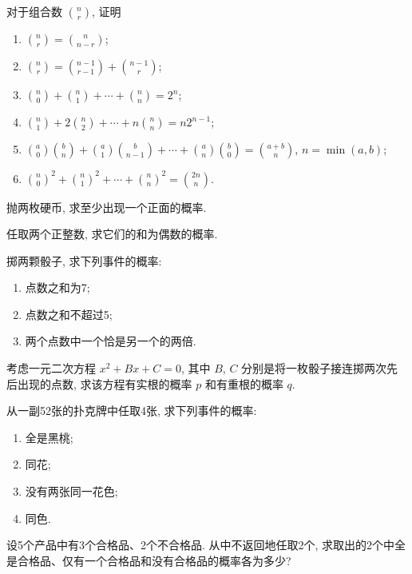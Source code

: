 \begin{xiti}
  \item 对于组合数 $\binom{n}{r}$, 证明
  \begin{enumerate}
    \item $\binom{n}{r} = \binom{n}{n - r}$;
    \item $\binom{n}{r} = \binom{n - 1}{r - 1} + \binom{n - 1}{r}$;
    \item $\binom{n}{0} + \binom{n}{1} + \dotsb + \binom{n}{n} = 2^n$;
    \item $\binom{n}{1} + 2\binom{n}{2} + \dotsb + n\binom{n}{n} = n 2^{n-1}$;
    \item $\binom{a}{0} \binom{b}{n} + \binom{a}{1} \binom{b}{n - 1} + \dotsb + \binom{a}{n} \binom{b}{0} = \binom{a + b}{n}$, $n = \min(a,b)$;
    \item $\binom{n}{0} ^2 + \binom{n}{1} ^2 + \dotsb + \binom{n}{n} ^2 = \binom{2n}{n}$.
  \end{enumerate}

  \item 抛两枚硬币,
  求至少出现一个正面的概率.

  \item 任取两个正整数,
  求它们的和为偶数的概率.

  \item 掷两颗骰子,
  求下列事件的概率:
  \begin{enumerate}
    \item 点数之和为7;
    \item 点数之和不超过5;
    \item 两个点数中一个恰是另一个的两倍.
  \end{enumerate}

  \item 考虑一元二次方程 $x^2 + Bx + C = 0$,
  其中 $B$, $C$ 分别是将一枚骰子接连掷两次先后出现的点数,
  求该方程有实根的概率 $p$ 和有重根的概率 $q$.

  \item 从一副52张的扑克牌中任取4张,
  求下列事件的概率:
  \begin{enumerate}
    \item 全是黑桃;
    \item 同花;
    \item 没有两张同一花色;
    \item 同色.
  \end{enumerate}

  \item 设5个产品中有3个合格品、2个不合格品.
  从中不返回地任取2个,
  求取出的2个中全是合格品、仅有一个合格品和没有合格品的概率各为多少?


\end{xiti}
